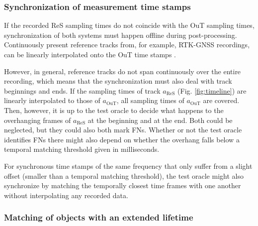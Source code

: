 \documentclass[conference]{IEEEtran}
\begin{document}


\subsubsection{Synchronization of measurement time stamps}
\label{sec:temp_sync}

If the recorded ReS sampling times do not coincide with the OuT sampling times, synchronization of both systems must happen offline during post-processing. %
Continuously present reference tracks from, for example, RTK-GNSS recordings, can be linearly interpolated onto the OuT time stamps \cite[Sec. 10.2.7]{Brahmi2020diss}.

However, in general, reference tracks do not span continuously over the entire recording, which means that the synchronization must also deal with track beginnings and ends. %
If the sampling times of track $a_\text{ReS}$ (Fig. \ref{fig:timeline}) are linearly interpolated to those of $a_\text{OuT}$, all sampling times of $a_\text{OuT}$ are covered. 
Then, however, it is up to the test oracle to decide what happens to the overhanging frames of $a_\text{ReS}$ at the beginning and at the end. 
Both could be neglected, but they could also both mark FNs. 
Whether or not the test oracle identifies FNs there might also depend on whether the overhang falls below a temporal matching threshold given in milliseconds.

For synchronous time stamps of the same frequency that only suffer from a slight offset (smaller than a temporal matching threshold), the test oracle might also synchronize by matching the temporally closest time frames with one another without interpolating any recorded data.


\subsubsection{Matching of objects with an extended lifetime}
\label{sec:temp_matching}
\end{document}
